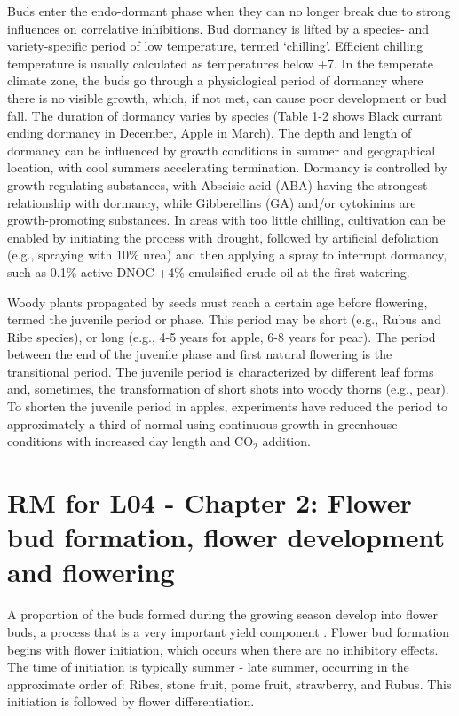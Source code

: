 \vspace{0.5em}
Buds enter the endo-dormant phase when they can no longer break due to strong influences on correlative inhibitions. Bud dormancy is lifted by a species- and variety-specific period of low temperature, termed ‘chilling’. Efficient chilling temperature is usually calculated as temperatures below +7\textdegree. In the temperate climate zone, the buds go through a physiological period of dormancy where there is no visible growth, which, if not met, can cause poor development or bud fall. The duration of dormancy varies by species (Table 1-2 shows Black currant ending dormancy in December, Apple in March). The depth and length of dormancy can be influenced by growth conditions in summer and geographical location, with cool summers accelerating termination. Dormancy is controlled by growth regulating substances, with Abscisic acid (ABA) having the strongest relationship with dormancy, while Gibberellins (GA) and/or cytokinins are growth-promoting substances. In areas with too little chilling, cultivation can be enabled by initiating the process with drought, followed by artificial defoliation (e.g., spraying with 10\% urea) and then applying a spray to interrupt dormancy, such as 0.1\% active DNOC +4\% emulsified crude oil at the first watering.

\vspace{0.5em}
Woody plants propagated by seeds must reach a certain age before flowering, termed the juvenile period or phase. This period may be short (e.g., Rubus and Ribe species), or long (e.g., 4-5 years for apple, 6-8 years for pear). The period between the end of the juvenile phase and first natural flowering is the transitional period. The juvenile period is characterized by different leaf forms and, sometimes, the transformation of short shots into woody thorns (e.g., pear). To shorten the juvenile period in apples, experiments have reduced the period to approximately a third of normal using continuous growth in greenhouse conditions with increased day length and CO$_2$ addition.


\section{RM for L04 - Chapter 2: Flower bud formation, flower development and flowering}

A proportion of the buds formed during the growing season develop into flower buds, a process that is a very important yield component \cite*{rm_03_L04_flower_bud_formation}. Flower bud formation begins with flower initiation, which occurs when there are no inhibitory effects. The time of initiation is typically summer - late summer, occurring in the approximate order of: Ribes, stone fruit, pome fruit, strawberry, and Rubus. This initiation is followed by flower differentiation.

